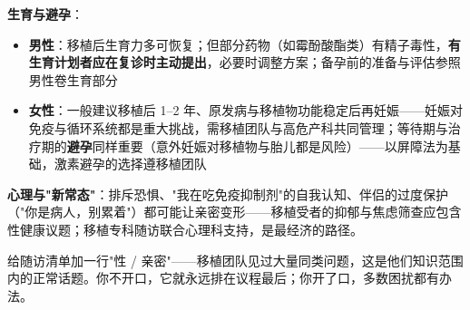 \vspace{0.5em}
\noindent\textbf{生育与避孕}：

\begin{itemize}
	\item \textbf{男性}：移植后生育力多可恢复；但部分药物（如霉酚酸酯类）有精子毒性，\textbf{有生育计划者应在复诊时主动提出}，必要时调整方案；备孕前的准备与评估参照男性卷生育部分
	\item \textbf{女性}：一般建议移植后 1--2 年、原发病与移植物功能稳定后再妊娠——妊娠对免疫与循环系统都是重大挑战，需移植团队与高危产科共同管理；等待期与治疗期的\textbf{避孕}同样重要（意外妊娠对移植物与胎儿都是风险）——以屏障法为基础，激素避孕的选择遵移植团队
\end{itemize}

\vspace{0.5em}
\noindent\textbf{心理与"新常态"}：排斥恐惧、"我在吃免疫抑制剂"的自我认知、伴侣的过度保护（"你是病人，别累着"）都可能让亲密变形——移植受者的抑郁与焦虑筛查应包含性健康议题；移植专科随访联合心理科支持，是最经济的路径。

\begin{tcolorbox}[colback=pink!5!white,colframe=red!50!black,title=贴心小叮咛]
给随访清单加一行"性 / 亲密"——移植团队见过大量同类问题，这是他们知识范围内的正常话题。你不开口，它就永远排在议程最后；你开了口，多数困扰都有办法。
\end{tcolorbox}

